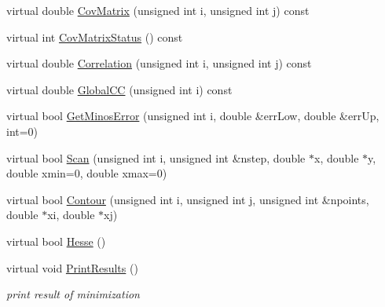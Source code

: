 \begin{DoxyCompactItemize}
virtual double \mbox{\hyperlink{classROOT_1_1Minuit2_1_1Minuit2Minimizer_a6ba10de01ab6e7228fa4908894de5619}{Cov\+Matrix}} (unsigned int i, unsigned int j) const
\item 
virtual int \mbox{\hyperlink{classROOT_1_1Minuit2_1_1Minuit2Minimizer_ad9f4873b9651626d2b83cf7eab826b0f}{Cov\+Matrix\+Status}} () const
\item 
virtual double \mbox{\hyperlink{classROOT_1_1Minuit2_1_1Minuit2Minimizer_a229e82025189e72b5a03cb4e3be19f4a}{Correlation}} (unsigned int i, unsigned int j) const
\item 
virtual double \mbox{\hyperlink{classROOT_1_1Minuit2_1_1Minuit2Minimizer_adde21edb0a67e0eef950049528cfb9a7}{Global\+CC}} (unsigned int i) const
\item 
virtual bool \mbox{\hyperlink{classROOT_1_1Minuit2_1_1Minuit2Minimizer_ab6c27c6f165821774dd304561e8956f5}{Get\+Minos\+Error}} (unsigned int i, double \&err\+Low, double \&err\+Up, int=0)
\item 
virtual bool \mbox{\hyperlink{classROOT_1_1Minuit2_1_1Minuit2Minimizer_a3f2f94c743a9b120a71da5ba23bd88cb}{Scan}} (unsigned int i, unsigned int \&nstep, double $\ast$x, double $\ast$y, double xmin=0, double xmax=0)
\item 
virtual bool \mbox{\hyperlink{classROOT_1_1Minuit2_1_1Minuit2Minimizer_a026780c27dd4b179817f826f49e36c8e}{Contour}} (unsigned int i, unsigned int j, unsigned int \&npoints, double $\ast$xi, double $\ast$xj)
\item 
virtual bool \mbox{\hyperlink{classROOT_1_1Minuit2_1_1Minuit2Minimizer_a0cfd04fde73c157de423705625ede51c}{Hesse}} ()
\item 
virtual void \mbox{\hyperlink{classROOT_1_1Minuit2_1_1Minuit2Minimizer_a0caadc2005eac5d87fc7345bd54decf0}{Print\+Results}} ()
\begin{DoxyCompactList}\small\item\em print result of minimization \end{DoxyCompactList}\end{DoxyCompactItemize}
